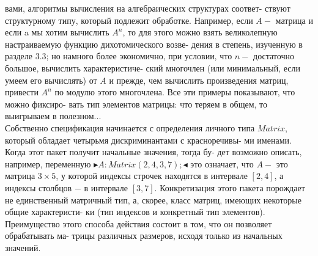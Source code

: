 вами,  алгоритмы  вычисления  на  алгебраических  структурах  соответ­-\linebreak
ствуют  структурному  типу,  который  подлежит  обработке.  Например,\linebreak
если $A-$ матрица и  если a мы хотим вычислить $A^n$,  то  для этого можно\linebreak 
взять  великолепную  настраиваемую  функцию  дихотомического  возве­-\linebreak
дения в степень,  изученную в разделе 3.3; но намного более экономично,\linebreak
при условии,  что $n-$ достаточно большое, вычислить характеристиче-\linebreak
ский  многочлен (или  минимальный,  если  умеем  его  вычислять) от $A$  и\linebreak 
прежде,  чем  вычислить  произведения  матриц,  привести  $A^n$  по  модулю \linebreak
этого  многочлена.  Все  эти  примеры  показывают,  что  можно  фиксиро­-\linebreak
вать  тип  элементов  матрицы:  что  теряем  в  общем,  то  выигрываем  в\linebreak
полезном...\\

Собственно  спецификация  начинается  с  определения  личного  типа\linebreak
$Matrix$, который обладает четырьмя дискриминантами с красноречивы-\linebreak
ми  именами.  Когда этот пакет  получит  начальные значения, тогда бу-\linebreak
дет возможно описать, например, переменную $\blacktriangleright A:Matrix(2,4,3,7);\blacktriangleleft$
это  означает,  что  $A-$ это  матрица  $3\times 5$,  у  которой  индексы  строчек\linebreak 
находятся  в  интервале  $[2,4]$,  а  индексы  столбцов  $-$  в  интервале  $[3,7]$.\linebreak 
Конкретизация  этого  пакета  порождает  не  единственный  матричный\linebreak
тип, а, скорее,  класс матриц, имеющих некоторые общие характеристи-\linebreak
ки  (тип  индексов  и  конкретный  тип  элементов).  Преимущество  этого\linebreak
способа  действия  состоит  в  том,  что  он  позволяет  обрабатывать  ма-\linebreak
трицы  различных  размеров,  исходя  только из  начальных значений.\\


